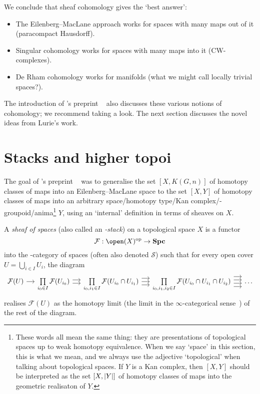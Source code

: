 
We conclude that sheaf cohomology gives the `best answer':
\begin{itemize}
\item The Eilenberg--MacLane approach works for spaces with many maps out of it (paracompact Hausdorff).
\item Singular cohomology works for spaces with many maps into it (CW-complexes).
\item De Rham cohomology works for manifolds (what we might call locally trivial spaces?).
\end{itemize}

The introduction of \citeauthor{lurieInfinityTopoi2003}'s preprint ~\cite{lurieInfinityTopoi2003} also discusses these various notions of cohomology; we recommend taking a look.
The next section discusses the novel ideas from Lurie's work.

\section{Stacks and higher topoi}
The goal of \citeauthor{lurieInfinityTopoi2003}'s preprint ~\cite{lurieInfinityTopoi2003} was to generalise the set \([X,K(G,n)]\) of homotopy classes of maps into an Eilenberg--MacLane space to the set \([X,Y]\) of homotopy classes of maps into an arbitrary space/homotopy type/Kan complex/\oo-groupoid/anima\footnote{These words all mean the same thing: they are presentations of topological spaces up to weak homotopy equivalence. When we say `space' in this section, this is what we mean, and we always use the adjective `topological' when talking about topological spaces. If \(Y\) is a Kan complex, then \([X,Y]\) should be interpreted as the set \([X,\lvert Y\rvert]\) of homotopy classes of maps into the geometric realisaton of \(Y\).} \(Y\), using an `internal' definition in terms of sheaves on \(X\).

\begin{defn}
A \emph{sheaf of spaces} (also called an \emph{\oo-stack}) on a topological space \(X\) is a functor
\[ \mathcal F\colon\open(X)\opp\to\catSpace \]
into the \oo-category of spaces (often also denoted \(\mathcal S\)) such that for every open cover \(U=\bigcup_{i\in I}U_i\), the diagram
\begin{equation*}
  \begin{tikzcd}[column sep=small]
    \mathcal F(U) \ar{r} & \prod\limits_{i_0\in I}\mathcal F(U_{i_0}) \ar[shift left]{r} \ar[shift right]{r} & \prod\limits_{i_0,i_1\in I}\mathcal F(U_{i_0}\cap U_{i_1}) \ar[shift left=2]{r} \ar{r} \ar[shift right=2]{r} & \prod\limits_{i_0,i_1,i_2\in I}\mathcal F(U_{i_0}\cap U_{i_1}\cap U_{i_2}) \ar[shift left=3]{r} \ar[shift left]{r} \ar[shift right]{r} \ar[shift right=3]{r} & \ldots
  \end{tikzcd}
\end{equation*}
realises \(\mathcal F(U)\) as the homotopy limit (the limit in the \(\infty\)-categorical sense~\cite[Definition 1.2.13.4]{lurieHigherToposTheory2009}) of the rest of the diagram.
\end{defn}

